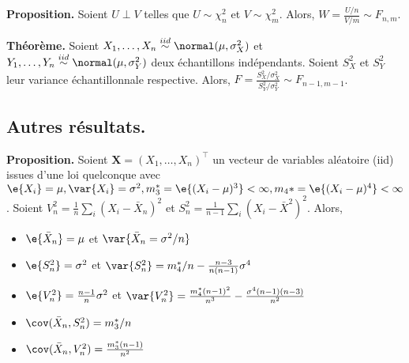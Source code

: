 \textbf{Proposition.} Soient $U \perp V$ telles que $U \sim \chi^2_n$ et $V \sim \chi^2_m$. Alors, $W = \frac{U/n}{V/m} \sim F_{n,m}$.

\textbf{Théorème.} Soient $X_1,\dots, X_n \overset{iid}{\sim} \normal(\mu,\sigma_X^2)$ et $Y_1,\dots, Y_n \overset{iid}{\sim} \normal(\mu,\sigma_Y^2)$ deux échantillons indépendants. Soient $S_X^2$ et $S_Y^2$ leur variance échantillonnale respective. Alors, $F=\frac{S^2_X/\sigma_X^2}{S^2_Y/\sigma_Y^2} \sim F_{n-1,m-1}$.

\subsection{Autres résultats.}
\textbf{Proposition.} Soient $\boldsymbol{X}=(X_1,\dots,X_n)^\top$ un vecteur de variables aléatoire (iid) issues d'une loi quelconque avec $\e{X_i}=\mu, \var{X_i}=\sigma^2, m_3^*=\e{(X_i-\mu)^3} < \infty, m_4*=\e{(X_i-\mu)^4} < \infty$. Soient $V^2_n=\frac{1}{n} \sum_i \left(X_i - \bar{X}_n \right)^2$ et $S^2_n = \frac{1}{n-1} \sum_i \left( X_i - \bar{X}^2 \right)^2$. Alors, 
\begin{itemize}
	\item $\e{\bar{X}_n}=\mu$ et $\var{\bar{X}_n=\sigma^2/n}$
	\item $\e{S_n^2}=\sigma^2$ et $\var{S_n^2}=m_4^*/n - \frac{n-3}{n(n-1)}\sigma^4$
	\item $\e{V_n^2}=\frac{n-1}{n}\sigma^2$ et $\var{V_n^2}=\frac{m^*_4(n-1)^2}{n^3} - \frac{\sigma^4(n-1)(n-3)}{n^2}$
	\item $\cov(\bar{X}_n,S^2_n)=m^*_3/n$
	\item $\cov(\bar{X}_n,V^2_n)=\frac{m^*_3(n-1)}{n^2}$
\end{itemize}